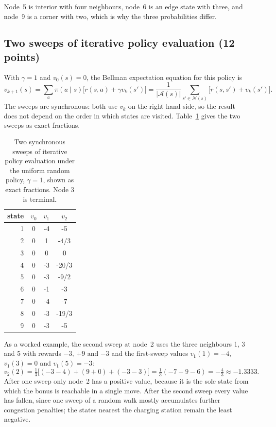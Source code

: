 \documentclass[11pt,a4paper]{article}
\begin{document}
Node~5 is interior with four neighbours, node~6 is an edge state with three, and
node~9 is a corner with two, which is why the three probabilities differ.

\subsection{Two sweeps of iterative policy evaluation (12 points)}

With $\gamma=1$ and $v_0(s)=0$, the Bellman expectation equation for this policy is
\begin{equation}
v_{k+1}(s)=\sum_{a}\pi(a\mid s)\big[r(s,a)+\gamma v_k(s')\big]
=\frac{1}{|\mathcal{A}(s)|}\sum_{s'\in\mathcal{N}(s)}
\big[r(s,s')+v_k(s')\big].
\end{equation}
The sweeps are synchronous: both use $v_k$ on the right-hand side, so the result does
not depend on the order in which states are visited. Table~\ref{tab:p33} gives the
two sweeps as exact fractions.

\begin{table}[H]
\centering
\caption{Two synchronous sweeps of iterative policy evaluation under the uniform random policy, $\gamma=1$, shown as exact fractions. Node 3 is terminal.}
\label{tab:p33}
\begin{tabular}{rccc}
\toprule
state & $v_0$ & $v_1$ & $v_2$ \\
\midrule
1 & 0 & -4 & -5 \\
2 & 0 & 1 & -4/3 \\
3 & 0 & 0 & 0 \\
4 & 0 & -3 & -20/3 \\
5 & 0 & -3 & -9/2 \\
6 & 0 & -1 & -3 \\
7 & 0 & -4 & -7 \\
8 & 0 & -3 & -19/3 \\
9 & 0 & -3 & -5 \\
\bottomrule
\end{tabular}
\end{table}

As a worked example, the second sweep at node~2 uses the three neighbours 1, 3 and 5
with rewards $-3$, $+9$ and $-3$ and the first-sweep values $v_1(1)=-4$, $v_1(3)=0$
and $v_1(5)=-3$:
\begin{equation}
v_2(2)=\tfrac{1}{3}\big[(-3-4)+(9+0)+(-3-3)\big]
=\tfrac{1}{3}(-7+9-6)=-\tfrac{4}{3}\approx-1.3333.
\end{equation}
After one sweep only node~2 has a positive value, because it is the sole state from
which the bonus is reachable in a single move. After the second sweep every value has
fallen, since one sweep of a random walk mostly accumulates further congestion
penalties; the states nearest the charging station remain the least negative.
\end{document}
